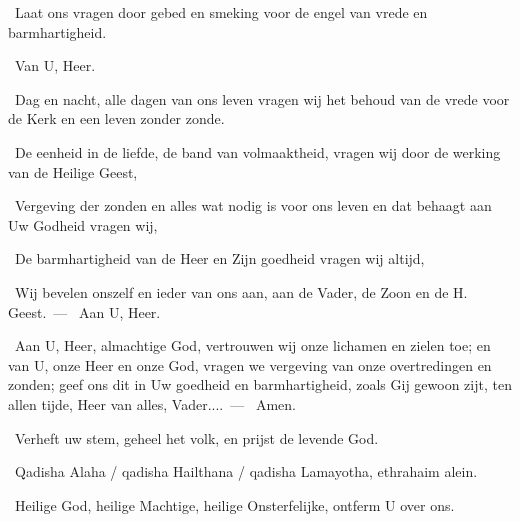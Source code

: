 \documentclass[12pt,twoside,a5paper]{article}
\begin{document}


\begin{halfparskip}
  \liturgicalLbracket\dd~Laat ons vragen door gebed en smeking voor de engel van vrede en barmhartigheid.

  \rr~Van U, Heer. 

  \dd~Dag en nacht, alle dagen van ons leven vragen wij het behoud van de vrede voor de Kerk en een leven zonder zonde.

  \dd~De eenheid in de liefde, de band van volmaaktheid, vragen wij door de werking van de Heilige Geest,

  \dd~Vergeving der zonden en alles wat nodig is voor ons leven en dat behaagt aan Uw Godheid vragen wij,

  \dd~De barmhartigheid van de Heer en Zijn goedheid vragen wij altijd,\liturgicalRbracket

  \dd~Wij bevelen onszelf en ieder van ons aan, aan de Vader, de Zoon en de H. Geest.~--- \rr~Aan U, Heer.

  \cc~Aan U, Heer, almachtige God, vertrouwen wij onze lichamen en zielen toe; en van U, onze Heer en onze God, vragen we vergeving van onze overtredingen en zonden; geef ons dit in Uw goedheid en barmhartigheid, zoals Gij gewoon zijt, ten allen tijde, Heer van alles, Vader....~--- \rr~Amen.
\end{halfparskip}



\dd~Verheft uw stem, geheel het volk, en prijst de levende God.

\vspace{\parskip}
\begin{doublecols}
  \fontsize{11}{12}\selectfont

  \dutchl \rr~Qadisha Alaha / qadisha Hailthana / qadisha Lamayotha, ethrahaim alein.

   \rr~Heilige God, heilige Machtige, heilige Onsterfelijke, ontferm U over ons.
\end{doublecols}
\end{document}
